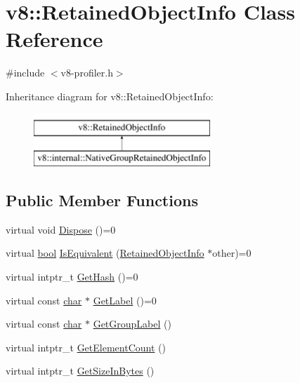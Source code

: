 \hypertarget{classv8_1_1RetainedObjectInfo}{}\section{v8\+:\+:Retained\+Object\+Info Class Reference}
\label{classv8_1_1RetainedObjectInfo}


{\ttfamily \#include $<$v8-\/profiler.\+h$>$}

Inheritance diagram for v8\+:\+:Retained\+Object\+Info\+:\begin{figure}[H]
\begin{center}
\leavevmode
\includegraphics[height=2.000000cm]{classv8_1_1RetainedObjectInfo}
\end{center}
\end{figure}
\subsection*{Public Member Functions}
\begin{DoxyCompactItemize}
\item 
virtual void \mbox{\hyperlink{classv8_1_1RetainedObjectInfo_a5011203f7c5949049ba36b8059f03eca}{Dispose}} ()=0
\item 
virtual \mbox{\hyperlink{classbool}{bool}} \mbox{\hyperlink{classv8_1_1RetainedObjectInfo_a286103bb076c85415919c86b1838c990}{Is\+Equivalent}} (\mbox{\hyperlink{classv8_1_1RetainedObjectInfo}{Retained\+Object\+Info}} $\ast$other)=0
\item 
virtual intptr\+\_\+t \mbox{\hyperlink{classv8_1_1RetainedObjectInfo_a6fdbfa242b95615e63f08433419c8066}{Get\+Hash}} ()=0
\item 
virtual const \mbox{\hyperlink{classchar}{char}} $\ast$ \mbox{\hyperlink{classv8_1_1RetainedObjectInfo_ad19106fc7f0499fd45005077551d54c0}{Get\+Label}} ()=0
\item 
virtual const \mbox{\hyperlink{classchar}{char}} $\ast$ \mbox{\hyperlink{classv8_1_1RetainedObjectInfo_adf835370c5516f2a89dd2d3f83dee10b}{Get\+Group\+Label}} ()
\item 
virtual intptr\+\_\+t \mbox{\hyperlink{classv8_1_1RetainedObjectInfo_ae6865597469bc7d28bd8ec71b4b890bd}{Get\+Element\+Count}} ()
\item 
virtual intptr\+\_\+t \mbox{\hyperlink{classv8_1_1RetainedObjectInfo_a1a899eed0b1f6e046edc3c7a7c08aa8c}{Get\+Size\+In\+Bytes}} ()
\end{DoxyCompactItemize}


